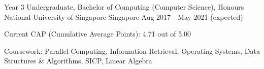 

\begin{cventries}

  \cventry
  {Year 3 Undergraduate, Bachelor of Computing (Computer Science), Honours} %
  {National University of Singapore} %
  {Singapore} %
  {Aug 2017 - May 2021 (expected)} %
  {
    \begin{cvitems} %
      \item {Current CAP (Cumulative Average Points): 4.71 out of 5.00}
      \item {Coursework: Parallel Computing, Information Retrieval, Operating Systems, Data Structures \& Algorithms, SICP, Linear Algebra}
    \end{cvitems}
  }




\end{cventries}
